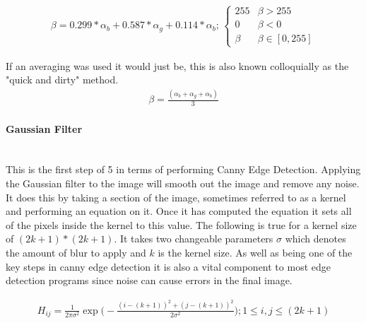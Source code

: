 \begin{flushleft}
            \begin{gather*}
                \beta = 0.299 * \alpha_{b} + 0.587 * \alpha_{g} + 0.114 * \alpha_{b}
                \text{; }
                \begin{cases}
                    255 & \beta > 255 \\
                    0 & \beta < 0 \\
                    \beta & \beta \in [0, 255]
                \end{cases}
            \end{gather*}
            
            \BK

            If an averaging was used it would just be, this is also known colloquially as the "quick and dirty" method. \\ \bk
            \begin{gather*}
                    \beta = \frac {(\alpha_{b} + \alpha_{g} + \alpha_{b})}{3}
            \end{gather*}

            \bk
            \paragraph{Gaussian Filter} \mbox{} \\
            This is the first step of 5 in terms of performing Canny Edge Detection. Applying the Gaussian filter to the image will smooth out the image and remove any noise. It does this by taking a section
            of the image, sometimes referred to as a kernel and performing an equation on it. Once it has computed the equation it sets all of the pixels inside the kernel to this value. The following is true 
            for a kernel size of $(2k + 1) * (2k + 1)$. It takes two changeable parameters $\sigma$ which denotes the amount of blur to apply and $k$ is the kernel size. As well as being one of the key steps in canny edge detection it is also a vital component to most edge detection programs since noise can cause errors in the final image.\\ \bk
            
            \begin{gather*}
                H_{ij} = \frac{1}{
                    2\pi\sigma^{2}
                } \exp \bigg(
                    -\frac{
                        (i - (k + 1))^{2} + (j - (k + 1))^{2}
                    }
                    {
                        2\sigma^{2}
                    }
                \bigg);1\leq i, j \leq(2k+1)
            \end{gather*}


\end{flushleft}
